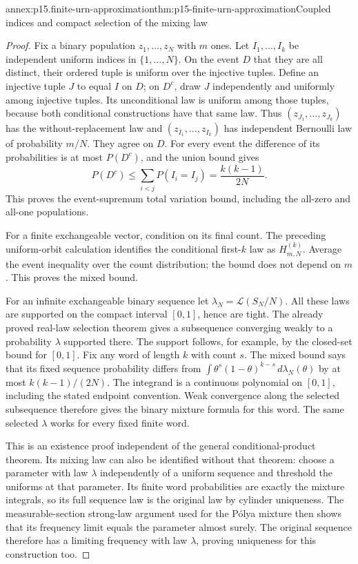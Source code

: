 \begin{annexitem}{annex:p15.finite-urn-approximation}{thm:p15-finite-urn-approximation}{Coupled indices and compact selection of the mixing law}
\begin{proof}
Fix a binary population \(z_1,\ldots,z_N\) with \(m\) ones.
Let \(I_1,\ldots,I_k\) be independent uniform indices in
\(\{1,\ldots,N\}\). On the event \(D\) that they are all distinct,
their ordered tuple is uniform over the injective tuples.
Define an injective tuple \(J\) to equal \(I\) on \(D\);
on \(D^c\), draw \(J\) independently and uniformly among injective tuples.
Its unconditional law is uniform among those tuples, because both
conditional constructions have that same law.
Thus \((z_{J_1},\ldots,z_{J_k})\) has the without-replacement law
and \((z_{I_1},\ldots,z_{I_k})\) has independent Bernoulli law
of probability \(m/N\). They agree on \(D\).
For every event the difference of its probabilities is at most
\(P(D^c)\), and the union bound gives
\[
                    P(D^c)
                       \leq\sum_{i<j}P(I_i=I_j)
                       =\frac{k(k-1)}{2N}.
\]
This proves the event-supremum total variation bound, including the
all-zero and all-one populations.

For a finite exchangeable vector, condition on its final count.
The preceding uniform-orbit calculation identifies the conditional
first-\(k\) law as \(H_{m,N}^{(k)}\).
Average the event inequality over the count distribution; the bound
does not depend on \(m\). This proves the mixed bound.

For an infinite exchangeable binary sequence let
\(\lambda_N=\mathcal L(S_N/N)\).
All these laws are supported on the compact interval \([0,1]\),
hence are tight. The already proved real-law selection theorem
gives a subsequence converging weakly to a probability \(\lambda\)
supported there. The support follows, for example, by the closed-set
bound for \([0,1]\).
Fix any word of length \(k\) with count \(s\).
The mixed bound says that its fixed sequence probability differs from
\(\int\theta^s(1-\theta)^{k-s}\,d\lambda_N(\theta)\)
by at most \(k(k-1)/(2N)\).
The integrand is a continuous polynomial on \([0,1]\), including
the stated endpoint convention. Weak convergence along the selected
subsequence therefore gives the binary mixture formula for this word.
The same selected \(\lambda\) works for every fixed finite word.

This is an existence proof independent of the general conditional-product
theorem. Its mixing law can also be identified without that theorem:
choose a parameter with law \(\lambda\) independently of a uniform
sequence and threshold the uniforms at that parameter.
Its finite word probabilities are exactly the mixture integrals,
so its full sequence law is the original law by cylinder uniqueness.
The measurable-section strong-law argument used for the Pólya mixture
then shows that its frequency limit equals the parameter almost surely.
The original sequence therefore has a limiting frequency with law
\(\lambda\), proving uniqueness for this construction too.
\end{proof}
\end{annexitem}

